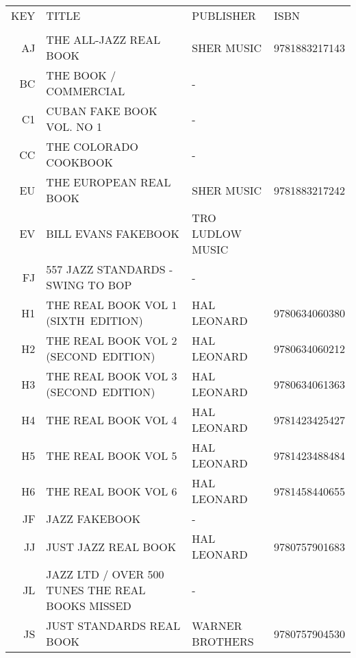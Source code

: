 \documentclass[6pt,landscape]{scrartcl}
\begin{document}
\selectfont
\begin{center}
  \begin{tabular}{rlll}%
    KEY & TITLE                                           & PUBLISHER          & ISBN \\
        &                                                 &                    & \\
    AJ  & THE ALL-JAZZ REAL BOOK                          & SHER MUSIC         & 9781883217143 \\
    BC  & THE BOOK / COMMERCIAL                           & -                  & \\
    C1  & CUBAN FAKE BOOK VOL. NO 1                       & -                  & \\
    CC  & THE COLORADO COOKBOOK                           & -                  & \\
    EU  & THE EUROPEAN REAL BOOK                          & SHER MUSIC         & 9781883217242 \\
    EV  & BILL EVANS FAKEBOOK                             & TRO LUDLOW MUSIC   & \\
    FJ  & 557 JAZZ STANDARDS - SWING TO BOP               & -                  & \\
    H1  & THE REAL BOOK VOL 1 (SIXTH~EDITION)             & HAL LEONARD        & 9780634060380 \\
    H2  & THE REAL BOOK VOL 2 (SECOND~EDITION)            & HAL LEONARD        & 9780634060212 \\
    H3  & THE REAL BOOK VOL 3 (SECOND~EDITION)            & HAL LEONARD        & 9780634061363 \\
    H4  & THE REAL BOOK VOL 4                             & HAL LEONARD        & 9781423425427 \\
    H5  & THE REAL BOOK VOL 5                             & HAL LEONARD        & 9781423488484 \\
    H6  & THE REAL BOOK VOL 6                             & HAL LEONARD        & 9781458440655 \\
    JF  & JAZZ FAKEBOOK                                   & -                  & \\
    JJ  & JUST JAZZ REAL BOOK                             & HAL LEONARD        & 9780757901683 \\
    JL  & JAZZ LTD / OVER 500 TUNES THE REAL BOOKS MISSED & -                  & \\
    JS  & JUST STANDARDS REAL BOOK                        & WARNER BROTHERS    & 9780757904530 \\

\end{tabular}
\end{center}
\end{document}
